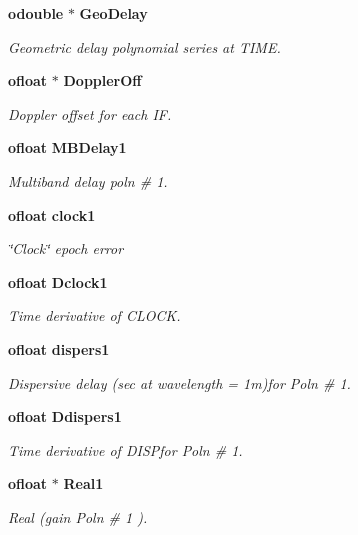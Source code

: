 \begin{CompactItemize}
{\bf odouble} $\ast$ {\bf Geo\-Delay}
\begin{CompactList}\small\item\em Geometric delay polynomial series at TIME. \item\end{CompactList}\item 
{\bf ofloat} $\ast$ {\bf Doppler\-Off}
\begin{CompactList}\small\item\em Doppler offset for each IF. \item\end{CompactList}\item 
{\bf ofloat} {\bf MBDelay1}
\begin{CompactList}\small\item\em Multiband delay poln \# 1. \item\end{CompactList}\item 
{\bf ofloat} {\bf clock1}
\begin{CompactList}\small\item\em \char`\"{}Clock\char`\"{} epoch error \item\end{CompactList}\item 
{\bf ofloat} {\bf Dclock1}
\begin{CompactList}\small\item\em Time derivative of CLOCK. \item\end{CompactList}\item 
{\bf ofloat} {\bf dispers1}
\begin{CompactList}\small\item\em Dispersive delay (sec at wavelength = 1m)for Poln \# 1. \item\end{CompactList}\item 
{\bf ofloat} {\bf Ddispers1}
\begin{CompactList}\small\item\em Time derivative of DISPfor Poln \# 1. \item\end{CompactList}\item 
{\bf ofloat} $\ast$ {\bf Real1}
\begin{CompactList}\small\item\em Real (gain Poln \# 1 ). \item\end{CompactList}\item 

\end{CompactItemize}
